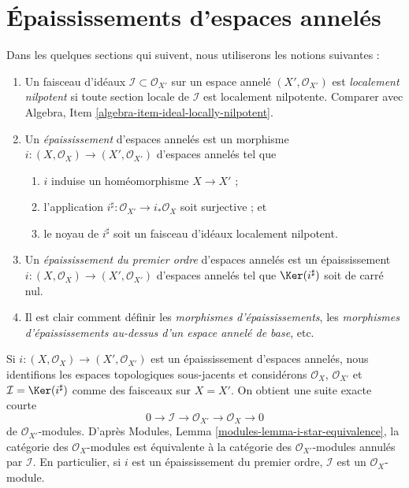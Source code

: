 \section{Épaississements d'espaces annelés}
\label{section-thickenings-spaces}

\noindent
Dans les quelques sections qui suivent, nous utiliserons les notions suivantes :
\begin{enumerate}
\item Un faisceau d'idéaux $\mathcal{I} \subset \mathcal{O}_{X'}$ sur
un espace annelé $(X', \mathcal{O}_{X'})$ est {\it localement nilpotent}
si toute section locale de $\mathcal{I}$ est localement nilpotente.
Comparer avec Algebra, Item \ref{algebra-item-ideal-locally-nilpotent}.
\item Un {\it épaississement} d'espaces annelés est un morphisme
$i : (X, \mathcal{O}_X) \to (X', \mathcal{O}_{X'})$ d'espaces annelés
tel que
\begin{enumerate}
\item $i$ induise un homéomorphisme $X \to X'$ ;
\item l'application $i^\sharp : \mathcal{O}_{X'} \to i_*\mathcal{O}_X$
soit surjective ; et
\item le noyau de $i^\sharp$ soit un faisceau d'idéaux localement nilpotent.
\end{enumerate}
\item Un {\it épaississement du premier ordre} d'espaces annelés est un épaississement
$i : (X, \mathcal{O}_X) \to (X', \mathcal{O}_{X'})$ d'espaces annelés
tel que $\Ker(i^\sharp)$ soit de carré nul.
\item Il est clair comment définir les {\it morphismes d'épaississements},
les {\it morphismes d'épaississements au-dessus d'un espace annelé de base}, etc.
\end{enumerate}
Si $i : (X, \mathcal{O}_X) \to (X', \mathcal{O}_{X'})$ est un épaississement
d'espaces annelés, nous identifions les espaces topologiques sous-jacents
et considérons $\mathcal{O}_X$, $\mathcal{O}_{X'}$ et
$\mathcal{I} = \Ker(i^\sharp)$ comme des faisceaux sur $X = X'$. On obtient
une suite exacte courte
$$
0 \to \mathcal{I} \to \mathcal{O}_{X'} \to \mathcal{O}_X \to 0
$$
de $\mathcal{O}_{X'}$-modules. D'après
Modules, Lemma \ref{modules-lemma-i-star-equivalence},
la catégorie des $\mathcal{O}_X$-modules est équivalente à la catégorie
des $\mathcal{O}_{X'}$-modules annulés par $\mathcal{I}$. En particulier,
si $i$ est un épaississement du premier ordre,
$\mathcal{I}$ est un $\mathcal{O}_X$-module.

